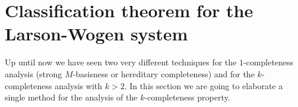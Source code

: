 \section{Classification theorem for the Larson-Wogen system}
  Up until now we have seen two very different techniques for the $1$-completeness analysis (strong $M$-basisness or hereditary completeness) and
    for the $k$-completeness analysis with $k>2$.
  In this section we are going to elaborate a single method for the analysis of the $k$-completeness property.
  
